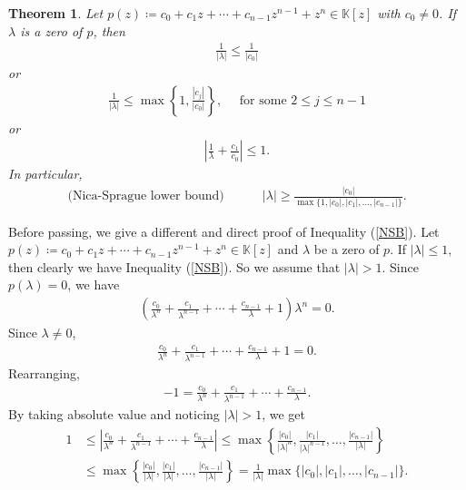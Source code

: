 \documentclass{amsart}
\newtheorem{theorem}{Theorem}[section]
\begin{document}
\begin{theorem} \cite{NICASPRAGUE}
	Let $p(z)\coloneqq c_0+c_1z+\cdots +c_{n-1}z^{n-1}+z^n \in \mathbb{K}[z]$ with $c_0\neq 0$.  If $\lambda$ is a  zero of $p$, then 
	\begin{align*}
		\frac{1}{|\lambda|}\leq \frac{1}{|c_0|}
	\end{align*}
	or 
	\begin{align*}
			\frac{1}{|\lambda|}\leq \max\left\{1, \frac{|c_j|}{|c_0|}\right\}, \quad \text{ for some } 2\leq j \leq n-1
	\end{align*}
	or
	\begin{align*}
		\left|\frac{1}{\lambda}+\frac{c_1}{c_0}\right|	\leq 1.
	\end{align*}
	In particular, 
	\begin{align*}
		\text{(Nica-Sprague lower bound)} \quad \quad \quad	|\lambda|\geq \frac{|c_0|}{\max\{1, |c_0|, |c_1|, \dots, |c_{n-1}|\}}.
	\end{align*}
\end{theorem}
Before passing, we give a different and direct proof of Inequality (\ref{NSB}). 	Let $p(z)\coloneqq c_0+c_1z+\cdots +c_{n-1}z^{n-1}+z^n \in \mathbb{K}[z]$ and  $\lambda$ be a  zero of $p$. If $|\lambda|\leq 1$, then clearly we have Inequality (\ref{NSB}). So we assume that $|\lambda|> 1$. Since $p(\lambda)=0$, we have 
\begin{align*}
	\left(\frac{c_0}{\lambda^n}+\frac{c_1}{\lambda^{n-1}}+\cdots +\frac{c_{n-1}}{\lambda}+1\right)\lambda^n=0.
\end{align*}
Since $\lambda \neq 0$, 
\begin{align*}
	\frac{c_0}{\lambda^n}+\frac{c_1}{\lambda^{n-1}}+\cdots +\frac{c_{n-1}}{\lambda}+1=0.
\end{align*}
Rearranging, 
\begin{align*}
	-1=\frac{c_0}{\lambda^n}+\frac{c_1}{\lambda^{n-1}}+\cdots +\frac{c_{n-1}}{\lambda}.
\end{align*}
By taking absolute value and noticing $|\lambda|>1$, we get 
\begin{align*}
	1&\leq \left|\frac{c_0}{\lambda^n}+\frac{c_1}{\lambda^{n-1}}+\cdots +\frac{c_{n-1}}{\lambda}\right|\leq \max\left\{\frac{|c_0|}{|\lambda|^n}, \frac{|c_1|}{|\lambda|^{n-1}}, \dots, \frac{|c_{n-1}|}{|\lambda|}\right\}\\
	&\leq \max\left\{\frac{|c_0|}{|\lambda|}, \frac{|c_1|}{|\lambda|}, \dots, \frac{|c_{n-1}|}{|\lambda|}\right\}=\frac{1}{|\lambda|}\max\{|c_0|, |c_1|, \dots, |c_{n-1}|\}.
\end{align*}
\end{document}
